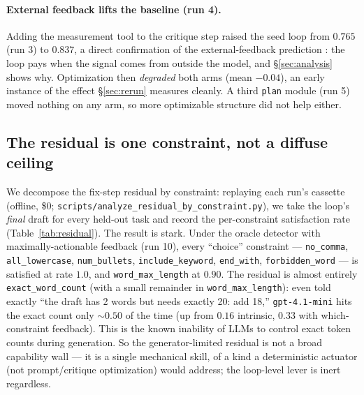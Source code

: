 \documentclass[11pt]{article}
\begin{document}
\paragraph{External feedback lifts the baseline (run 4).} Adding the measurement tool to the
critique step raised the seed loop from $0.765$ (run 3) to $0.837$, a direct confirmation of
the external-feedback prediction \citep{huang2023cannot}: the loop pays when the signal comes
from outside the model, and \S\ref{sec:analysis} shows why. Optimization then \emph{degraded}
both arms (mean $-0.04$), an early instance of the effect \S\ref{sec:rerun} measures cleanly.
A third \texttt{plan} module (run 5) moved nothing on any arm, so more optimizable structure
did not help either.


\subsection{The residual is one constraint, not a diffuse ceiling}
\label{sec:residual}

We decompose
the fix-step residual by constraint: replaying each run's cassette (offline, \$0;
\texttt{scripts/\allowbreak analyze\_residual\_\allowbreak by\_constraint.py}), we take the loop's \emph{final}
draft for every held-out task and record the per-constraint satisfaction rate
(Table~\ref{tab:residual}). The result is stark. Under the oracle detector with
maximally-actionable feedback (run 10), every ``choice'' constraint --- \texttt{no\_comma},
\texttt{all\_lowercase}, \texttt{num\_bullets}, \texttt{include\_keyword},
\texttt{end\_with}, \texttt{forbidden\_word} --- is satisfied at rate $1.0$, and
\texttt{word\_max\_length} at $0.90$. The residual is almost entirely
\texttt{exact\_word\_count} (with a small remainder in \texttt{word\_max\_length}):
even told exactly ``the draft has 2 words but needs exactly 20: add 18,''
\texttt{gpt-4.1-mini} hits the exact count only $\sim\!0.50$ of the time (up from
$0.16$ intrinsic, $0.33$ with which-constraint feedback). This is the known
inability of LLMs to control exact token counts during generation. So the
generator-limited residual is not a broad capability wall --- it is a single mechanical
skill, of a kind a deterministic actuator (not prompt/critique optimization) would
address; the loop-level lever is inert regardless.
\end{document}
